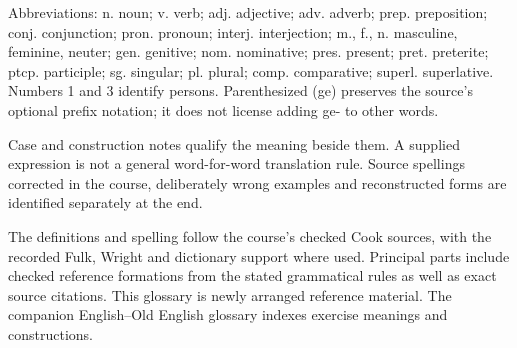 Abbreviations: n. noun; v. verb; adj. adjective; adv. adverb; prep. preposition; conj. conjunction; pron. pronoun; interj. interjection; m., f., n. masculine, feminine, neuter; gen. genitive; nom. nominative; pres. present; pret. preterite; ptcp. participle; sg. singular; pl. plural; comp. comparative; superl. superlative. Numbers 1 and 3 identify persons. Parenthesized (ge) preserves the source's optional prefix notation; it does not license adding ge- to other words.\par
Case and construction notes qualify the meaning beside them. A supplied expression is not a general word-for-word translation rule. Source spellings corrected in the course, deliberately wrong examples and reconstructed forms are identified separately at the end.\par
The definitions and spelling follow the course's checked Cook sources, with the recorded Fulk, Wright and dictionary support where used. Principal parts include checked reference formations from the stated grammatical rules as well as exact source citations. This glossary is newly arranged reference material. The companion English–Old English glossary indexes exercise meanings and constructions.\par
\clearpage
\fontsize{10.5}{13.2}\selectfont
\setlength{\parskip}{3.8pt}
